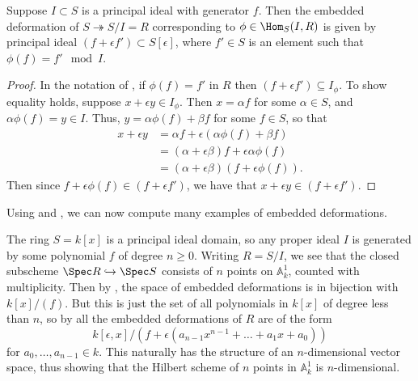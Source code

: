 \begin{corollary} \label{principal} 
    Suppose $I\subset S$ is a principal ideal with generator
    \(f\). Then the embedded deformation of \(S\twoheadrightarrow S/I=R\)
    corresponding to \(\phi\in \Hom_S(I,R)\) is given by principal ideal
    \((f+\epsilon f')\subset S[\epsilon]\), where $f'\in S$ is an element such
    that $\phi(f)=f'\mod I$.     
    \begin{proof} 
        In the notation of , if $\phi(f)=f'$ in $R$ then
        $(f+\epsilon f')\subseteq I_\phi$.  To show equality holds, suppose
        $x+\epsilon y\in I_\phi$. Then $x=\alpha f$ for some $\alpha \in S$, and
        $\alpha\phi(f)=y\in I$. Thus, $y=\alpha\phi(f)+\beta f$ for some $f\in
        S$, so that 
        \begin{align*} 
            x+\epsilon y&=\alpha f+\epsilon(\alpha\phi(f)+\beta f) \\ 
                        &=(\alpha+\epsilon\beta) f +\epsilon\alpha\phi(f) \\ 
                        &=(\alpha+\epsilon\beta)(f+\epsilon\phi(f)).  
        \end{align*} 
        Then since $f+\epsilon\phi(f)\in (f+\epsilon f')$, we have that
        $x+\epsilon y\in (f+\epsilon f')$.  
    \end{proof}
\end{corollary}

Using  and , we can now compute many examples of
embedded deformations. 

\begin{example} 
    \label{n points} 
    The ring $S=k[x]$ is a principal ideal domain, so any proper ideal
    $I$ is generated by some polynomial \(f\) of degree \(n\geq 0\). Writing $R=S/I$,
    we see that the closed subscheme $\Spec R\hookrightarrow \Spec S$ consists
    of $n$ points on $\mathbb{A}^1_k$, counted with multiplicity. Then by ,
    the space of embedded deformations is in bijection with $k[x]/(f)$. But this
    is just the set of all polynomials in $k[x]$ of degree less than $n$, so by
     all the embedded deformations of $R$ are of the form 
    \[k[\epsilon,x]/(f+\epsilon (a_{n-1}x^{n-1}+\ldots+a_1x+a_0))\] 
    for $a_0,\ldots,a_{n-1}\in k$. This naturally has the structure of an
    \(n\)-dimensional vector space, thus showing that the Hilbert scheme of \(n\)
    points in \(\mathbb{A}^1_k\) is \(n\)-dimensional.
\end{example}

